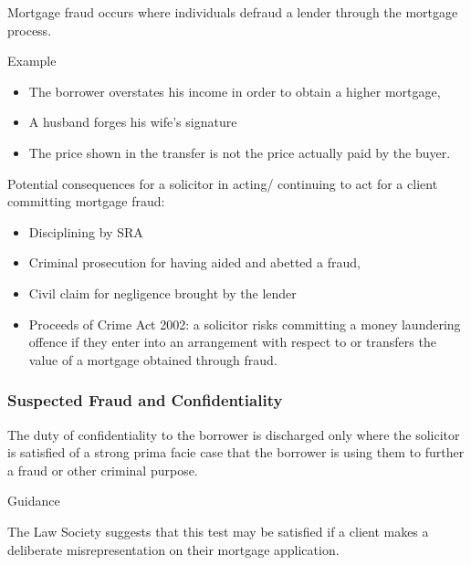 \documentclass[
]{article}
\providecommand{\tightlist}{%
  \setlength{\itemsep}{0pt}\setlength{\parskip}{0pt}}
\newenvironment{env-785438bb-4d67-4370-80ef-9aa959fc6b60}
{
    \savenotes\tcolorbox[blanker,breakable,left=5pt,borderline west={2pt}{-4pt}{darkred}]
}
{
    \endtcolorbox\spewnotes
}
\newenvironment{env-de3101d4-f08b-48eb-bc0e-2fa06f3bcf8e}
{
    \savenotes\tcolorbox[blanker,breakable,left=5pt,borderline west={2pt}{-4pt}{purple}]
}
{
    \endtcolorbox\spewnotes
}
\begin{document}
Mortgage fraud occurs where individuals defraud a lender through the
mortgage process.

\begin{env-de3101d4-f08b-48eb-bc0e-2fa06f3bcf8e}

Example

\begin{itemize}
\tightlist
\item
  The borrower overstates his income in order to obtain a higher
  mortgage,
\item
  A husband forges his wife's signature
\item
  The price shown in the transfer is not the price actually paid by the
  buyer.
\end{itemize}

\end{env-de3101d4-f08b-48eb-bc0e-2fa06f3bcf8e}

Potential consequences for a solicitor in acting/ continuing to act for
a client committing mortgage fraud:

\begin{itemize}
\tightlist
\item
  Disciplining by SRA
\item
  Criminal prosecution for having aided and abetted a fraud,
\item
  Civil claim for negligence brought by the lender
\item
  Proceeds of Crime Act 2002: a solicitor risks committing a money
  laundering offence if they enter into an arrangement with respect to
  or transfers the value of a mortgage obtained through fraud.
\end{itemize}

\hypertarget{suspected-fraud-and-confidentiality}{%
\subsubsection{Suspected Fraud and
Confidentiality}\label{suspected-fraud-and-confidentiality}}

The duty of confidentiality to the borrower is discharged only where the
solicitor is satisfied of a strong prima facie case that the borrower is
using them to further a fraud or other criminal purpose.

\begin{env-785438bb-4d67-4370-80ef-9aa959fc6b60}

Guidance

The Law Society suggests that this test may be satisfied if a client
makes a deliberate misrepresentation on their mortgage application.

\end{env-785438bb-4d67-4370-80ef-9aa959fc6b60}
\end{document}
